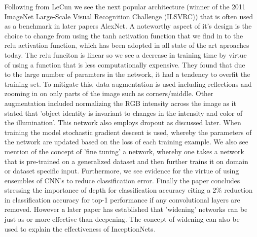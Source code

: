   Following from LeCun we see the next popular architecture (winner of the 2011 ImageNet Large-Scale Visual Recognition Challenge (ILSVRC)) that is often used as a benchmark in later papers AlexNet\cite{Krizhevsky}. A noteworthy aspect of it's design is the choice to change from using the tanh activation function that we find in \cite{leCun1998} to the relu activation function, which has been adopted in all state of the art aproaches today. The relu funciton is linear so we see a decrease in training time by virtue of using a function that is less computationally expensive. They found that due to the large number of paramters in the network, it had a tendency to overfit the training set. To mitigate this, data augmentation is used including reflections and zooming in on only parts of the image such as corners/middle. Other augmentation included normalizing the RGB intensity across the image as it stated that 'object identity is invariant to changes in the intensity and color of the illumination'. This network also employs dropout as discussed later. When training the model stochastic gradient descent is used, whereby the parameters of the network are updated based on the loss of each training example. We also see mention of the concept of 'fine tuning' a network, whereby one takes a network that is pre-trained on a generalized dataset and then further trains it on domain or dataset specific input. Furthermore, we see evidence for the virtue of using ensembles of CNN's to reduce classification error. Finally the paper concludes stressing the importance of depth for classification accuracy citing a 2\% reduction in classification accuracy for top-1 performance if any convolutional layers are removed. However a later paper \cite{Zagoruyko} has established that 'widening' networks can be just as or more effective than deepening. The concept of widening can also be used to explain the effectiveness of InceptionNets.
  \par
